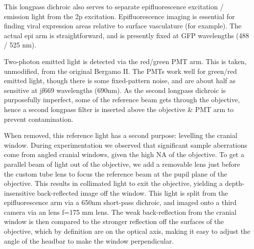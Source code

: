 \documentclass[a4paper,12pt]{article}
\begin{document}
This longpass dichroic also serves to separate epifluorescence excitation / emission light from the 2p excitation.  Epifluorescence imaging is essential for finding viral expression areas relative to surface vasculature (for example).  The actual epi arm is straightforward, and is presently fixed at GFP wavelengths (488 / 525 nm).  

Two-photon emitted light is detected via the red/green PMT arm.  This is taken, unmodified, from the original Bergamo II.  The PMTs work well for green/red emitted light, though there is some fixed-pattern noise, and are about half as sensitive at jf669 wavelengths (690nm).  As the second longpass dichroic is purposefully imperfect, some of the reference beam gets through the objective, hence a second longpass filter is inserted above the objective \& PMT arm to prevent contamination.  

When removed, this reference light has a second purpose: levelling the cranial window.  During experimentation we observed that significant sample aberrations come from angled cranial windows,  given the high NA of the objective.  To get a parallel beam of light out of the objective, we add a removable lens just before the custom tube lens to focus the reference beam at the pupil plane of the objective.  This results in collimated light to exit the objective, yielding a depth-insensitive back-reflected image off the window.  This light is split from the epifluorescence arm via a 650nm short-pass dichroic, and imaged onto a third camera via an lens f=175 mm lens.  The weak back-reflection from the cranial window is then compared to the stronger reflection off the surfaces of the objective, which by definition are on the optical axis, making it easy to adjust the angle of the headbar to make the window perpendicular.  
\end{document}
